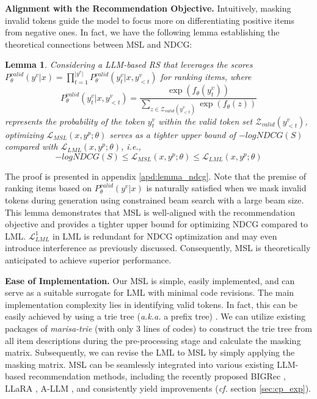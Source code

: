 \documentclass[sigconf,natbib=true]{acmart}
\newtheorem{lemma}{Lemma}
\newcommand{\ie}{\emph{i.e., }}
\newcommand{\cf}{\emph{cf. }}
\newcommand{\aka}{\emph{a.k.a. }}
\begin{document}
\textbf{Alignment with the Recommendation Objective.} Intuitively, masking invalid tokens guide the model to focus more on differentiating positive items from negative ones. In fact, we have the following lemma establishing the theoretical connections between MSL and NDCG:
\begin{lemma}
\label{lemma_ndcg}
Considering a LLM-based RS that leverages the scores $P_\theta^{valid}(y^v|x) = \prod_{t=1}^{|y^v|} P_\theta^{valid}(y^v_t|x,y^v_{<t})$ for ranking items, where
$$P_\theta^{valid}(y^v_t|x,y^v_{<t}) = \frac{\exp(f_\theta(y_t^v))}{\sum_{z \in \mathcal{Z}_{valid}(y^v_{<t})} \exp{(f_\theta(z))}}$$ 
represents the probability of the token \( y^v_t \) within the valid token set \( \mathcal{Z}_{valid}(y^v_{<t}) \), optimizing $\mathcal{L}_{MSL}(x,y^p;\theta)$ serves as a tighter upper bound of $-log NDCG(S)$ compared with $\mathcal{L}_{LML}(x,y^p;\theta)$, \ie 
$$-log NDCG(S) \leq \mathcal{L}_{MSL}(x,y^p;\theta) \leq \mathcal{L}_{LML}(x,y^p;\theta)$$ 
\end{lemma}
The proof is presented in appendix \ref{apd:lemma_ndcg}. Note that the premise of ranking items based on $P_\theta^{valid}(y^v|x)$ is naturally satisfied when we mask invalid tokens during generation using constrained beam search with a large beam size. This lemma demonstrates that MSL is well-aligned with the recommendation objective and provides a tighter upper bound for optimizing NDCG compared to LML. \(\mathcal{L}_{LML}^1\) in LML is redundant for NDCG optimization and may even introduce interference as previously discussed. Consequently, MSL is theoretically anticipated to achieve superior performance.

\textbf{Ease of Implementation.} Our MSL is simple, easily implemented, and can serve as a suitable surrogate for LML with minimal code revisions. The main implementation complexity lies in identifying valid tokens. 
In fact, this can be easily achieved by using a trie tree (\aka a prefix tree) \cite{bodon2003trie}. We can utilize existing packages of \textit{marisa-trie} (with only 3 lines of codes) to construct the trie tree from all item descriptions during the pre-processing stage and calculate the masking matrix. Subsequently, we can revise the LML to MSL by simply applying the masking matrix. MSL can be seamlessly integrated into various existing LLM-based recommendation methods, including the recently proposed BIGRec \cite{bao2023bi}, LLaRA \cite{liao2024llara}, A-LLM \cite{kim2024large}, and consistently yield improvements (\cf section \ref{sec:cp_exp}).
\end{document}
